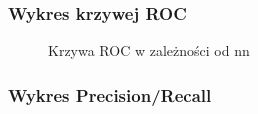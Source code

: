 \documentclass[12pt, a4paper]{article}
\begin{document}
\subsubsection{Wykres krzywej ROC}

\begin{figure}[H]
  \begin{center}
  \end{center}
  \caption{Krzywa ROC w zależności od nn}
  \label{fig:ubcf-nn-rmse}
\end{figure}

\subsubsection{Wykres Precision/Recall}
\end{document}
